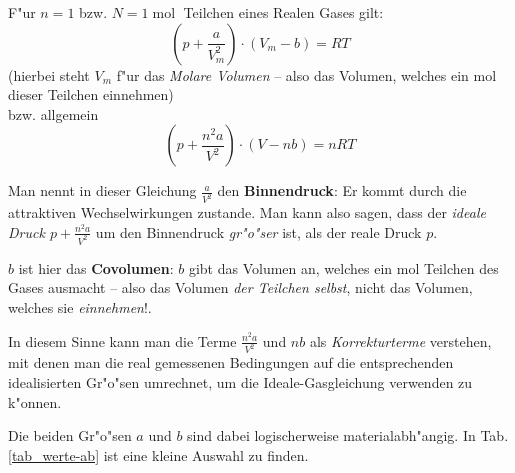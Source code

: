 \begin{Def}
F"ur $n = 1$ bzw. $N = 1\operatorname{mol}$ Teilchen eines Realen Gases gilt:
\begin{equation}
   \label{eqn_reale-gasgleichung}
   \boxed{
\left ( p + \frac{a}{V_m^2} \right )  \cdot  \left( V_m - b \right ) = RT
}
\end{equation}
(hierbei steht $V_m$ f"ur das \emph{Molare
  Volumen} -- also das
Volumen, welches ein mol dieser Teilchen einnehmen)\\
bzw. allgemein
\begin{equation}
   \label{eqn_reale-gasgleichung-extended}
   \left ( p + \frac{n^2a}{V^2} \right )  \cdot  \left( V - nb \right ) = nRT
\end{equation}
\end{Def}

Man nennt in dieser Gleichung $\frac{a}{V^2}$ den
\textbf{Binnendruck}: Er kommt durch die attraktiven
Wechselwirkungen zustande. Man kann also sagen, dass der \emph{ideale
  Druck $p + \frac{n^2 a}{V^2}$} um den Binnendruck \emph{gr"o"ser} ist, als der reale
Druck $p$. 

$b$ ist hier das \textbf{Covolumen}: $b$ gibt das
Volumen an, welches ein mol Teilchen des Gases ausmacht -- also das
Volumen \emph{der Teilchen selbst}, nicht das Volumen, welches sie
\emph{einnehmen}!.

In diesem Sinne kann man die Terme $\frac{n^2 a}{V^2}$ und $nb$ als
\emph{Korrekturterme} verstehen, mit denen man die real gemessenen
Bedingungen auf die entsprechenden idealisierten Gr"o"sen umrechnet,
um die Ideale-Gasgleichung verwenden zu k"onnen.

Die beiden Gr"o"sen $a$ und $b$ sind dabei logischerweise
materialabh"angig. In Tab. \ref{tab_werte-ab} ist eine kleine Auswahl
zu finden.

